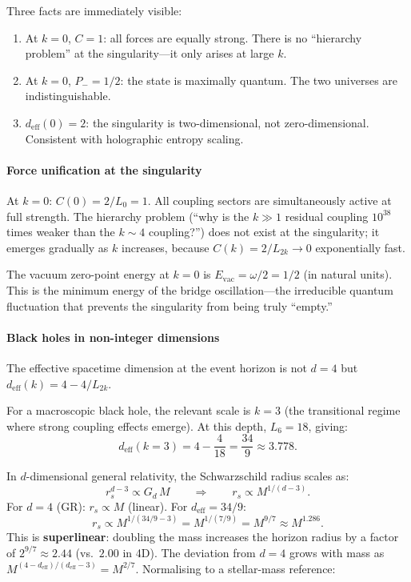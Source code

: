 \documentclass[12pt,a4paper]{article}
\begin{document}
\noindent Three facts are immediately visible:
\begin{enumerate}[nosep]
\item At $k = 0$, $C = 1$: all forces are equally strong. There is no ``hierarchy problem'' at the singularity---it only arises at large $k$.
\item At $k = 0$, $P_- = 1/2$: the state is maximally quantum. The two universes are indistinguishable.
\item $d_{\mathrm{eff}}(0) = 2$: the singularity is two-dimensional, not zero-dimensional. Consistent with holographic entropy scaling.
\end{enumerate}
\paragraph{Force unification at the singularity}
\label{sec:bh-unification}

At $k = 0$: $C(0) = 2/L_0 = 1$.  All coupling sectors are simultaneously active at full strength.  The hierarchy problem (``why is the $k \gg 1$ residual coupling $10^{38}$ times weaker than the $k \sim 4$ coupling?'') does not exist at the singularity; it emerges gradually as $k$ increases, because $C(k) = 2/L_{2k} \to 0$ exponentially fast.

The vacuum zero-point energy at $k = 0$ is $E_{\mathrm{vac}} = \omega/2 = 1/2$ (in natural units). This is the minimum energy of the bridge oscillation---the irreducible quantum fluctuation that prevents the singularity from being truly ``empty.''
\paragraph{Black holes in non-integer dimensions}
\label{sec:bh-dimensions}

The effective spacetime dimension at the event horizon is not $d = 4$ but $d_{\mathrm{eff}}(k) = 4 - 4/L_{2k}$.

For a macroscopic black hole, the relevant scale is $k = 3$ (the transitional regime where strong coupling effects emerge).  At this depth, $L_6 = 18$, giving:
\begin{equation}
d_{\mathrm{eff}}(k{=}3) = 4 - \frac{4}{18} = \frac{34}{9} \approx 3.778.
\end{equation}

In $d$-dimensional general relativity, the Schwarzschild radius scales as:
\begin{equation}
r_s^{d-3} \propto G_d\,M \qquad \Longrightarrow \qquad r_s \propto M^{1/(d-3)}.
\end{equation}
For $d = 4$ (GR): $r_s \propto M$ (linear). For $d_{\mathrm{eff}} = 34/9$:
\begin{equation}
r_s \propto M^{1/(34/9 - 3)} = M^{1/(7/9)} = M^{9/7} \approx M^{1.286}.
\end{equation}
This is \textbf{superlinear}: doubling the mass increases the horizon radius by a factor of $2^{9/7} \approx 2.44$ (vs.\ $2.00$ in 4D). The deviation from $d = 4$ grows with mass as $M^{(4-d_{\mathrm{eff}})/(d_{\mathrm{eff}}-3)} = M^{2/7}$. Normalising to a stellar-mass reference:
\end{document}
